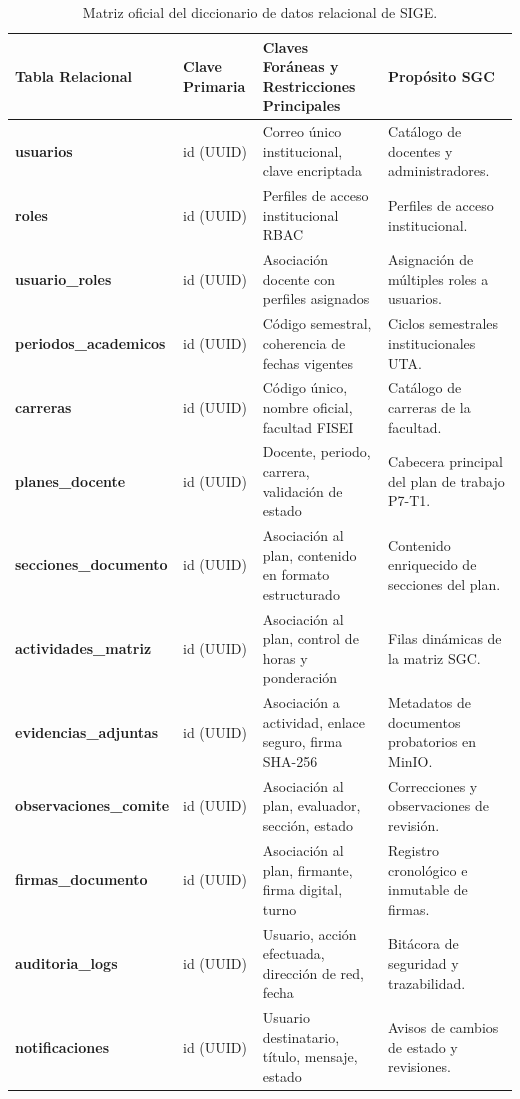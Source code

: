 \documentclass[12pt,a4paper]{article}
\begin{document}
\begin{table}[H]
\centering
\small
\renewcommand{\arraystretch}{1.15}
\begin{tabularx}{\textwidth}{|>{\hsize=1.0\hsize\raggedright\arraybackslash\bfseries\footnotesize}X|>{\hsize=0.4\hsize\centering\arraybackslash\footnotesize}X|>{\hsize=1.3\hsize\raggedright\arraybackslash\footnotesize}X|>{\hsize=1.3\hsize\raggedright\arraybackslash\footnotesize}X|}
\hline
\rowcolor{tableheader}
\textbf{Tabla Relacional} & \textbf{Clave Primaria} & \textbf{Claves Foráneas y Restricciones Principales} & \textbf{Propósito SGC} \\
\hline
usuarios & id (UUID) & Correo único institucional, clave encriptada & Catálogo de docentes y administradores. \\
\hline
roles & id (UUID) & Perfiles de acceso institucional RBAC & Perfiles de acceso institucional. \\
\hline
usuario\allowbreak\_roles & id (UUID) & Asociación docente con perfiles asignados & Asignación de múltiples roles a usuarios. \\
\hline
periodos\allowbreak\_academicos & id (UUID) & Código semestral, coherencia de fechas vigentes & Ciclos semestrales institucionales UTA. \\
\hline
carreras & id (UUID) & Código único, nombre oficial, facultad FISEI & Catálogo de carreras de la facultad. \\
\hline
planes\allowbreak\_docente & id (UUID) & Docente, periodo, carrera, validación de estado & Cabecera principal del plan de trabajo P7-T1. \\
\hline
secciones\allowbreak\_documento & id (UUID) & Asociación al plan, contenido en formato estructurado & Contenido enriquecido de secciones del plan. \\
\hline
actividades\allowbreak\_matriz & id (UUID) & Asociación al plan, control de horas y ponderación & Filas dinámicas de la matriz SGC. \\
\hline
evidencias\allowbreak\_adjuntas & id (UUID) & Asociación a actividad, enlace seguro, firma SHA-256 & Metadatos de documentos probatorios en MinIO. \\
\hline
observaciones\allowbreak\_comite & id (UUID) & Asociación al plan, evaluador, sección, estado & Correcciones y observaciones de revisión. \\
\hline
firmas\allowbreak\_documento & id (UUID) & Asociación al plan, firmante, firma digital, turno & Registro cronológico e inmutable de firmas. \\
\hline
auditoria\allowbreak\_logs & id (UUID) & Usuario, acción efectuada, dirección de red, fecha & Bitácora de seguridad y trazabilidad. \\
\hline
notificaciones & id (UUID) & Usuario destinatario, título, mensaje, estado & Avisos de cambios de estado y revisiones. \\
\hline
\end{tabularx}
\caption{Matriz oficial del diccionario de datos relacional de SIGE.}
\label{tab:diccionario_datos}
\end{table}
\end{document}
